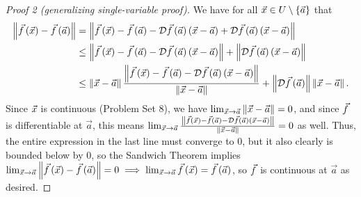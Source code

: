 \documentclass[main.tex]{subfiles}
\begin{document}
\begin{proof}[Proof 2 (generalizing single-variable proof)]
    We have for all $\vec{x}\in U\setminus\left\{ \vec{a} \right\}$ that
    \begin{align*}
        \left\lVert \vec{f}\left( \vec{x} \right) - \vec{f}\left( \vec{a} \right) \right\rVert &= \left\lVert \vec{f}\left( \vec{x} \right) - \vec{f}\left( \vec{a} \right) - \mathcal{D}\vec{f}\left( \vec{a} \right)\left( \vec{x} - \vec{a} \right) + \mathcal{D}\vec{f}\left( \vec{a} \right)\left( \vec{x} - \vec{a} \right) \right\rVert \\
        &\le \left\lVert \vec{f}\left( \vec{x} \right) - \vec{f}\left( \vec{a} \right) - \mathcal{D}\vec{f}\left( \vec{a} \right)\left( \vec{x} - \vec{a} \right) \right\rVert + \left\lVert \mathcal{D}\vec{f}\left( \vec{a} \right)\left( \vec{x} - \vec{a} \right) \right\rVert \\
        &\le \left\lVert \vec{x} - \vec{a} \right\rVert\frac{\left\lVert \vec{f}\left( \vec{x} \right) - \vec{f}\left( \vec{a} \right) - \mathcal{D}\vec{f}\left( \vec{a} \right)\left( \vec{x} - \vec{a} \right) \right\rVert}{\left\lVert \vec{x} - \vec{a} \right\rVert} + \left\lVert \mathcal{D}\vec{f}\left( \vec{a} \right) \right\rVert\left\lVert \vec{x} - \vec{a} \right\rVert.
    \end{align*}
    Since $\vec{x}$ is continuous (Problem Set 8), we have $\lim_{\vec{x}\to \vec{a}} \left\lVert \vec{x} - \vec{a} \right\rVert = 0$, and since $\vec{f}$ is differentiable at $\vec{a}$, this means  $\lim_{\vec{x}\to \vec{a}} \frac{\left\lVert \vec{f}\left( \vec{x} \right) - \vec{f}\left( \vec{a} \right) - \mathcal{D}\vec{f}\left( \vec{a} \right)\left( \vec{x} - \vec{a} \right) \right\rVert}{\left\lVert \vec{x} - \vec{a} \right\rVert} = 0$ as well. Thus, the entire expression in the last line must converge to 0, but it also clearly is bounded below by $0$, so the Sandwich Theorem implies $\lim_{\vec{x}\to \vec{a}}\left\lVert \vec{f}\left( \vec{x} \right) - \vec{f}\left( \vec{a} \right) \right\rVert = 0\implies \lim_{\vec{x}\to \vec{a}} \vec{f}\left( \vec{x} \right) = \vec{f}\left( \vec{a} \right)$, so $\vec{f}$ is continuous at $\vec{a}$ as desired.
\end{proof}
\end{document}
